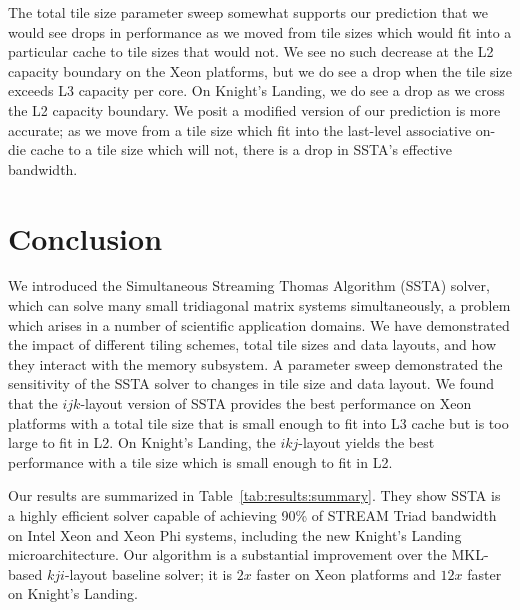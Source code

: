 \documentclass[10pt, conference, compsocconf]{IEEEtran}
\newcommand{\textapprox}{\texttildelow}
\begin{document}
The total tile size parameter sweep somewhat supports our prediction that we
  would see drops in performance as we moved from tile sizes which would
  fit into a particular cache to tile sizes that would not.
We see no such decrease at the L2 capacity boundary on the Xeon platforms, but
  we do see a drop when the tile size exceeds L3 capacity per core.
On Knight's Landing, we do see a drop as we cross the L2 capacity boundary.
We posit a modified version of our prediction is more accurate; as we move from
  a tile size which fit into the last-level associative on-die cache to a tile
  size which will not, there is a drop in SSTA's effective bandwidth.

\section{Conclusion}
\label{sec:conclusion}


We introduced the Simultaneous Streaming Thomas Algorithm (SSTA) solver, which
  can solve many small tridiagonal matrix systems simultaneously, a
  problem which arises in a number of scientific application domains.
We have demonstrated the impact of different tiling schemes, total tile sizes
  and data layouts, and how they interact with the memory subsystem.
A parameter sweep demonstrated the sensitivity of the SSTA solver to changes in
  tile size and data layout.
We found that the \(ijk\)-layout version of SSTA provides the best performance
  on Xeon platforms with a total tile size that is small enough to fit into 
  L3 cache but is too large to fit in L2.
On Knight's Landing, the \(ikj\)-layout yields the best performance with a
  tile size which is small enough to fit in L2.

Our results are summarized in Table~\ref{tab:results:summary}.
They show SSTA is a highly efficient solver capable of achieving 90\%
  of STREAM Triad bandwidth on Intel Xeon and Xeon Phi systems, including the new
  Knight's Landing microarchitecture.
Our algorithm is a substantial improvement over the MKL-based \(kji\)-layout
  baseline solver; it is \textapprox \(2x\) faster on Xeon platforms and
  \textapprox \(12x\) faster on Knight's Landing.
\end{document}
